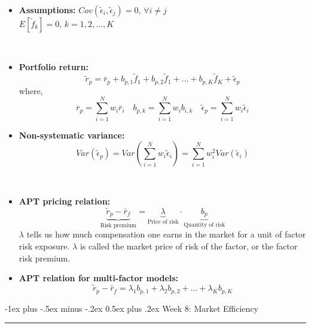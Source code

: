 \documentclass[10pt,landscape,a4paper]{article}
\makeatletter
\renewcommand{\section}{\@startsection{section}{1}{0mm}%
                                {-1ex plus -.5ex minus -.2ex}%
                                {0.5ex plus .2ex}%
                                {\normalfont\large\bfseries}}
\makeatother
\begin{document}
\begin{multicols*}{3}
\begin{description}[itemsep=0pt]
\begin{itemize}
		\item {\bf Assumptions:} 
		$Cov( \tilde{\epsilon}_i , \tilde{\epsilon}_j ) = 0 \text{, } \forall{i \neq j} $ \\
		$E[\tilde{f}_k]=0 \text{, } k=1,2, \dots , K $
		
	\end{itemize}
\end{description}

\begin{description}[itemsep=0pt]
	\item[Portfolio return]  ~
	\begin{itemize}
		\item {\bf Portfolio return:} $$ \tilde{r}_p = \bar{r}_p +  b_{p,1} \tilde{f}_1 + b_{p,2} \tilde{f}_1 + \dots + b_{p,K} \tilde{f}_K  +\tilde{\epsilon}_p $$
		where, 
		$$ \bar{r}_p = \sum_{i=1}^{N}{w_i \bar{r}_i}  \quad   b_{p,k}=\sum_{i=1}^{N}{w_i b_{i,k}} \quad  \tilde{\epsilon}_p = \sum_{i=1}^{N}{w_i \tilde{\epsilon}_i}$$
		\item {\bf Non-systematic variance:} $$ Var( \tilde{\epsilon}_p) = Var \left( \sum_{i=1}^{N}{w_i \tilde{\epsilon}_i}  \right) = \sum_{i=1}^{N}{w_i ^2 Var (\tilde{\epsilon}_i)} $$
		
	\end{itemize}
\end{description}


\begin{description}[itemsep=0pt]
	\item[Expected Returns on Diversified Portfolios]  ~
	\begin{itemize}
		\item {\bf APT pricing relation:} $$ \underbrace{\tilde{r}_p - \bar{r}_f}_{\text{Risk premium}} =  \underbrace{\lambda}_{\text{Price of risk}} \cdot \underbrace{b_p}_{\text{Quantity of risk}} $$ $\lambda$ tells us how much compensation one earns in the market for a unit of
		factor risk exposure. $\lambda$ is called the market price of risk of the factor, or the factor risk premium.
	   \item {\bf APT relation for multi-factor models:} $$ \tilde{r}_p - \bar{r}_f = \lambda_1 b_{p,1} + \lambda_2 b_{p,2} + \dots + \lambda_K b_{p,K} $$
		
	\end{itemize}
\end{description}




\section{Week 8: Market Efficiency}\smallskip \hrule height 1pt \smallskip


\end{multicols*}
\end{document}
